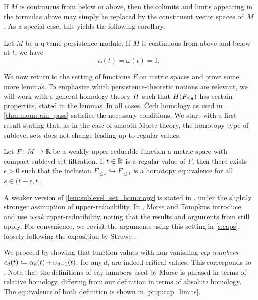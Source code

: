 If $M$ is continuous from below or above, then the colimits and limits appearing in the formulas above may simply be replaced by the constituent vector spaces of~$M$.
As a special case, this yields the following corollary.

\begin{cor}
\label{cor:regular_value_no_endpoint}
	Let $M$ be a q-tame persistence module.
	If $M$ is continuous from above and below at $t$, we have
	\[
		\alpha(t) = \omega(t) = 0.
	\]
\end{cor}

We now return to the setting of functions $F$ on metric spaces and prove some more lemmas.
To emphasize which persistence-theoretic notions are relevant, we will work with a general homology theory $H$ such that $H(F_{\leq \bullet})$ has certain properties, stated in the lemmas.
In all cases, \v{C}ech homology as used in \cref{thm:mountain_pass} satisfies the necessary conditions.
We start with a first result stating that, as in the case of smooth Morse theory, the homotopy type of sublevel sets does not change leading up to regular values.

\begin{lem}\label{lem:sublevel_set_homotopy}
	Let $F \colon M \to \mathbb{R}$ be a weakly upper-reducible function a metric space with compact sublevel set filtration.
	If $t \in \mathbb{R}$ is a regular value of $F$, then there exists $\epsilon > 0$ such that the inclusion $F_{\leq s} \hookrightarrow F_{\leq t}$ is a homotopy equivalence for all $s \in (t - \epsilon, t]$.
\end{lem}

A weaker version of \cref{lem:sublevel_set_homotopy} is stated in \cite[Lemma 8.1]{Morse.1938}, under the slightly stronger assumption of upper-reducibility.
In \cite{Morse.1939}, Morse and Tompkins introduce and use \emph{weak} upper-reducibility, noting that the results and arguments from \cite[Sections 7 and 8]{Morse.1938} still apply.
For convenience, we revisit the arguments using this setting in \cref{s:caps}, loosely following the exposition by Struwe \cite[Remark II.6.3]{Struwe.1988}.

We proceed by showing that function values with non-vanishing \emph{cap numbers} $c_d(t) \coloneqq \alpha_d(t) + \omega_{d-1}(t)$, for any $d$, are indeed critical values.
This corresponds to \cite[Theorem 8.1]{Morse.1938}.
Note that the definitions of cap numbers used by Morse is phrased in terms of relative homology, differing from our definition in terms of absolute homology. The equivalence of both definition is shown in \cref{prop:cap_limits}.

